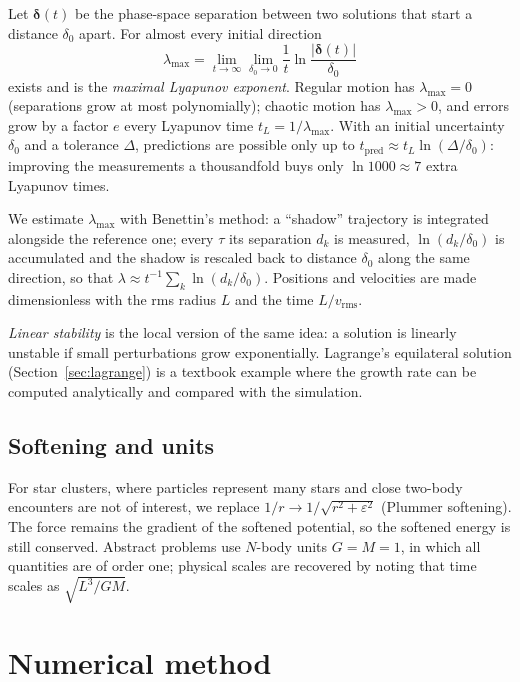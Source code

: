 \documentclass[11pt,a4paper]{article}
\begin{document}
Let $\boldsymbol\delta(t)$ be the phase-space separation between two solutions that start
a distance $\delta_0$ apart. For almost every initial direction
\begin{equation}
  \lambda_\text{max}=\lim_{t\to\infty}\lim_{\delta_0\to0}\frac1t\ln\frac{|\boldsymbol\delta(t)|}{\delta_0}
\end{equation}
exists and is the \emph{maximal Lyapunov exponent}. Regular motion has
$\lambda_\text{max}=0$ (separations grow at most polynomially); chaotic motion has
$\lambda_\text{max}>0$, and errors grow by a factor $e$ every Lyapunov time
$t_L=1/\lambda_\text{max}$. With an initial uncertainty $\delta_0$ and a tolerance $\Delta$,
predictions are possible only up to $t_\text{pred}\approx t_L\ln(\Delta/\delta_0)$: improving
the measurements a thousandfold buys only $\ln 1000\approx7$ extra Lyapunov times.

We estimate $\lambda_\text{max}$ with Benettin's method: a ``shadow'' trajectory is
integrated alongside the reference one; every $\tau$ its separation $d_k$ is measured,
$\ln(d_k/\delta_0)$ is accumulated and the shadow is rescaled back to distance $\delta_0$
along the same direction, so that $\lambda\approx t^{-1}\sum_k\ln(d_k/\delta_0)$.
Positions and velocities are made dimensionless with the rms radius $L$ and the time
$L/v_\text{rms}$.

\emph{Linear stability} is the local version of the same idea: a solution is linearly
unstable if small perturbations grow exponentially. Lagrange's equilateral solution
(Section~\ref{sec:lagrange}) is a textbook example where the growth rate can be computed
analytically and compared with the simulation.

\subsection{Softening and units}

For star clusters, where particles represent many stars and close two-body encounters
are not of interest, we replace $1/r\to1/\sqrt{r^2+\varepsilon^2}$ (Plummer softening).
The force remains the gradient of the softened potential, so the softened energy is
still conserved. Abstract problems use $N$-body units $G=M=1$, in which all quantities
are of order one; physical scales are recovered by noting that time scales as
$\sqrt{L^3/GM}$.

\section{Numerical method}\label{sec:numerics}
\end{document}
